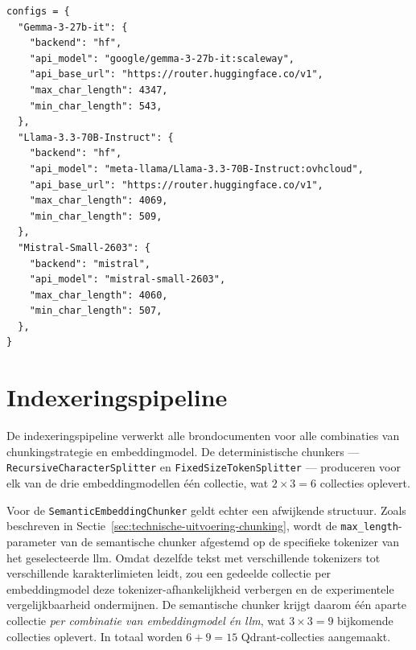 \begin{listing}[H]
\begin{verbatim}
configs = {
  "Gemma-3-27b-it": {
    "backend": "hf",
    "api_model": "google/gemma-3-27b-it:scaleway",
    "api_base_url": "https://router.huggingface.co/v1",
    "max_char_length": 4347,
    "min_char_length": 543,
  },
  "Llama-3.3-70B-Instruct": {
    "backend": "hf",
    "api_model": "meta-llama/Llama-3.3-70B-Instruct:ovhcloud",
    "api_base_url": "https://router.huggingface.co/v1",
    "max_char_length": 4069,
    "min_char_length": 509,
  },
  "Mistral-Small-2603": {
    "backend": "mistral",
    "api_model": "mistral-small-2603",
    "max_char_length": 4060,
    "min_char_length": 507,
  },
}
\end{verbatim}
\caption[HyPSTER \gls{llm}-configuratie]{De \texttt{max\_char\_length}- en \texttt{min\_char\_length}-waarden per \gls{llm} stemmen respectievelijk de maximale en minimale chunkgrootte van de semantische chunker af op de specifieke tokenizer van het model (Sectie~\ref{sec:technische-uitvoering-chunking}). De twee \texttt{backend}-waarden bepalen welke \gls{api}-client in de querypipeline wordt geïnstantieerd: \texttt{"hf"} voor de HuggingFace Inference Router, \texttt{"mistral"} voor de officiële Mistral \gls{api}.}
\label{lst:hypster-llm}
\end{listing}

\section{Indexeringspipeline}
\label{sec:indexering}

De indexeringspipeline verwerkt alle brondocumenten voor alle combinaties van chunkingstrategie en embeddingmodel. De deterministische chunkers — \texttt{RecursiveCharacterSplitter} en \texttt{FixedSizeTokenSplitter} — produceren voor elk van de drie embeddingmodellen één collectie, wat $2 \times 3 = 6$ collecties oplevert.

Voor de \texttt{SemanticEmbeddingChunker} geldt echter een afwijkende structuur. Zoals beschreven in Sectie~\ref{sec:technische-uitvoering-chunking}, wordt de \texttt{max\_length}-parameter van de semantische chunker afgestemd op de specifieke tokenizer van het geselecteerde \gls{llm}. Omdat dezelfde tekst met verschillende tokenizers tot verschillende karakterlimieten leidt, zou een gedeelde collectie per embeddingmodel deze tokenizer-afhankelijkheid verbergen en de experimentele vergelijkbaarheid ondermijnen. De semantische chunker krijgt daarom één aparte collectie \emph{per combinatie van embeddingmodel én \gls{llm}}, wat $3 \times 3 = 9$ bijkomende collecties oplevert. In totaal worden $6 + 9 = 15$ Qdrant-collecties aangemaakt.

